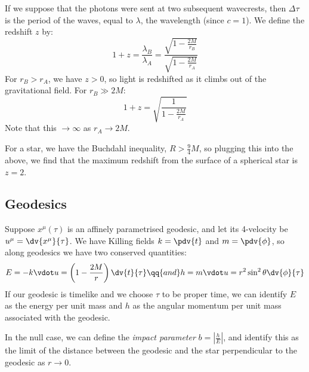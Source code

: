 \documentclass{jknotes}
\begin{document}
If we suppose that the photons were sent at two subsequent wavecrests, then \(\Delta \tau\) is the period of the waves, equal to \(\lambda\), the wavelength (since \(c=1\)). We define the redshift \(z\) by:
\begin{equation}
    1 + z = \frac{\lambda_B}{\lambda_A} = \frac{\sqrt{1 - \frac{2M}{r_B}}}{\sqrt{1-\frac{2M}{r_A}}}
\end{equation}
For \(r_B > r_A\), we have \(z>0\), so light is redshifted as it climbs out of the gravitational field. For \(r_B\gg 2M\):
\begin{equation}
    1 + z = \sqrt{\frac{1}{1 - \frac{2M}{r_A}}}
\end{equation}
Note that this \(\rightarrow \infty\) as \(r_A\rightarrow2M\).

For a star, we have the Buchdahl inequality, \(R>\frac{9}{4}M\), so plugging this into the above, we find that the maximum redshift from the surface of a spherical star is \(z=2\).

\subsection{Geodesics}
Suppose \(x^\mu(\tau)\) is an affinely parametrised geodesic, and let its 4-velocity be \(u^\mu = \dv{x^\mu}{\tau}\). We have Killing fields \(k=\pdv{t}\) and \(m=\pdv{\phi}\), so along geodesics we have two conserved quantities:
\begin{equation}
    E=-k\vdot u = \left( 1-\frac{2M}{r} \right)\dv{t}{\tau}
    \qq{and}
    h = m\vdot u = r^2\sin^2\theta\dv{\phi}{\tau}
\end{equation}
If our geodesic is timelike and we choose \(\tau\) to be proper time, we can identify \(E\) as the energy per unit mass and \(h\) as the angular momentum per unit mass associated with the geodesic.

In the null case, we can define the \emph{impact parameter} \(b = \left|\frac{h}{E}\right|\), and identify this as the limit of the distance between the geodesic and the star perpendicular to the geodesic as \(r\rightarrow 0\).
\begin{figure}[H]
    \centering
\end{figure}
\end{document}
